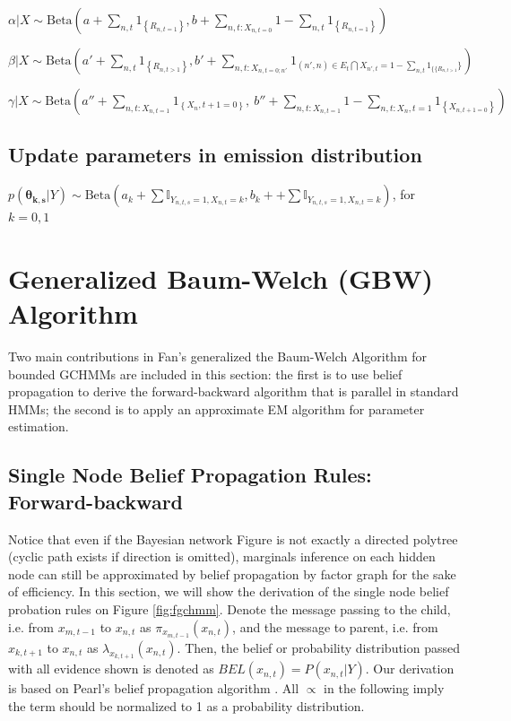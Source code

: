 \documentclass{article} %
\begin{document}
$\alpha | X \sim \text{Beta}( a + \sum_{n,t}1_{\left \{ R_{n, t=1} \right \}},b+ \sum_{n,t:X_{n,t=0}}1- \sum_{n,t}1_{\left \{ R_{n,t=1} \right \}})$

$\beta | X \sim \text{Beta}({a}' + \sum_{n,t}1_{\left \{R_{n,t >1}\right \}}, {b}' + \sum_{n,t:X_{n,t=0;n'}}1_{(n',n) \in E_{t} \bigcap X_{n', t} =1  - \sum_{n,t}1_{\{ \{ R_{n,t>1}} \}})$

$\gamma| X \sim \text{Beta}(a'' + \sum_{n,t:X_{n,t=1}}1_{\left \{ X_n,t+1=0 \right \}},\ b''+ \sum_{n,t:X_{n,t=1}}1 -\sum_{n,t:X_n,t=1}
1_{\left \{ X_{n,t+1=0} \right \}})$

\subsection{Update parameters in emission distribution}
$p(\boldsymbol{\theta_{k,s}}| Y) \sim \text{Beta}(a_k + \sum \mathbb{I}_{Y_{n,t,s}=1, X_{n,t}=k}, b_k + + \sum \mathbb{I}_{Y_{n,t,s}=1, X_{n,t}=k})$, for $k = 0, 1$

\section{Generalized Baum-Welch (GBW) Algorithm}

Two main contributions in Fan's generalized the Baum-Welch Algorithm for bounded GCHMMs are included in this section: the first is to use belief propagation to derive the forward-backward algorithm that is parallel in standard HMMs; the second is to apply an approximate EM algorithm for parameter estimation. 

\subsection{Single Node Belief Propagation Rules: Forward-backward}
Notice that even if the Bayesian network Figure is not exactly a directed polytree (cyclic path exists if direction is omitted), marginals inference on each hidden node can still be approximated by belief propagation by factor graph for the sake of efficiency. In this section, we will show the derivation of the single node belief probation rules on Figure \ref{fig:fgchmm}. Denote the message passing to the child, i.e. from $x_{m,t-1}$ to $x_{n,t}$ as $\pi_{x_{m,t-1}}(x_{n,t})$, and the message to parent, i.e. from $x_{k,t+1}$ to $x_{n,t}$ as $\lambda_{x_{k,t+1}}(x_{n,t})$. Then, the belief or probability distribution passed with all evidence shown is denoted as $BEL(x_{n,t})=P(x_{n,t}|Y)$. Our derivation is based on Pearl's belief propagation algorithm \cite{pearl1988probabilistic}. All $\propto$ in the following imply the term should be normalized to 1 as a probability distribution.
\end{document}
